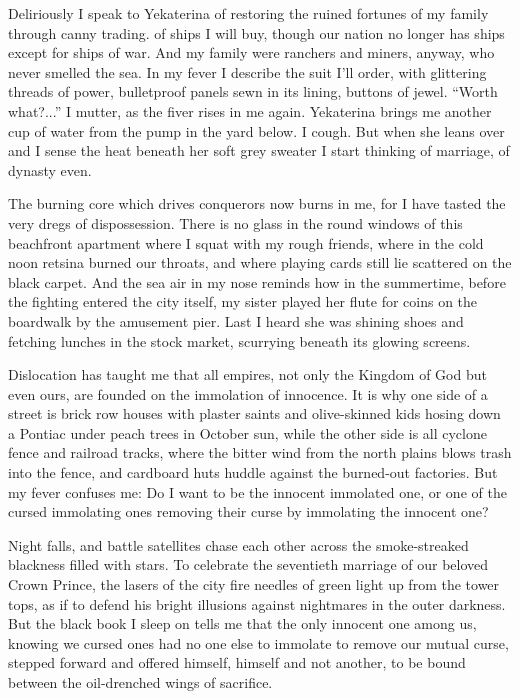 \documentclass[english,11pt,letterpaper,onecolumn]{scrbook}
\begin{document}
	Deliriously I speak to Yekaterina of restoring the ruined fortunes of my family through canny trading. of ships I will buy, though our nation no longer has ships except for ships of war.  And my family were ranchers and miners, anyway, who never smelled the sea.  In my fever I describe the suit I'll order, with glittering threads of power, bulletproof panels sewn in its lining, buttons of jewel.  ``Worth what?...'' I mutter, as the fiver rises in me again.  Yekaterina brings me another cup of water from the pump in the yard below.  I cough.  But when she leans over and I sense the heat beneath her soft grey sweater I start thinking of marriage, of dynasty even.

	The burning core which drives conquerors now burns in me, for I have tasted the very dregs of dispossession.  There is no glass in the round windows of this beachfront apartment where I squat with my rough friends, where in the cold noon retsina burned our throats, and where playing cards still lie scattered on the black carpet.  And the sea air in my nose reminds how in the summertime, before the fighting entered the city itself, my sister played her flute for coins on the boardwalk by the amusement pier.  Last I heard she was shining shoes and fetching lunches in the stock market, scurrying beneath its glowing screens.

	Dislocation has taught me that all empires, not only the Kingdom of God but even ours, are founded on the immolation of innocence.  It is why one side of a street is brick row houses with plaster saints and olive-skinned kids hosing down a Pontiac under peach trees in October sun, while the other side is all cyclone fence and railroad tracks, where the bitter wind from the north plains blows trash into the fence, and cardboard huts huddle against the burned-out factories.  But my fever confuses me:  Do I want to be the innocent immolated one, or one of the cursed immolating ones removing their curse by immolating the innocent one?

	Night falls, and battle satellites chase each other across the smoke-streaked blackness filled with stars.  To celebrate the seventieth marriage of our beloved Crown Prince, the lasers of the city fire needles of green light up from the tower tops, as if to defend his bright illusions against nightmares in the outer darkness.  But the black book I sleep on tells me that the only innocent one among us, knowing we cursed ones had no one else to immolate to remove our mutual curse, stepped forward and offered himself, himself and not another, to be bound between the oil-drenched wings of sacrifice.
\end{document}
